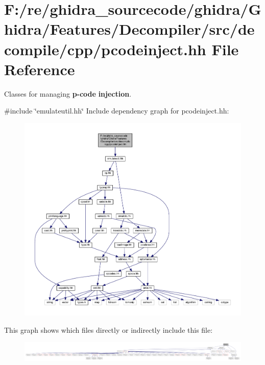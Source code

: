 \hypertarget{pcodeinject_8hh}{}\section{F\+:/re/ghidra\+\_\+sourcecode/ghidra/\+Ghidra/\+Features/\+Decompiler/src/decompile/cpp/pcodeinject.hh File Reference}
\label{pcodeinject_8hh}


Classes for managing {\bfseries{p-\/code}} {\bfseries{injection}}.  


{\ttfamily \#include \char`\"{}emulateutil.\+hh\char`\"{}}\newline
Include dependency graph for pcodeinject.\+hh\+:
\nopagebreak
\begin{figure}[H]
\begin{center}
\leavevmode
\includegraphics[width=350pt]{pcodeinject_8hh__incl}
\end{center}
\end{figure}
This graph shows which files directly or indirectly include this file\+:
\nopagebreak
\begin{figure}[H]
\begin{center}
\leavevmode
\includegraphics[width=350pt]{pcodeinject_8hh__dep__incl}
\end{center}
\end{figure}
